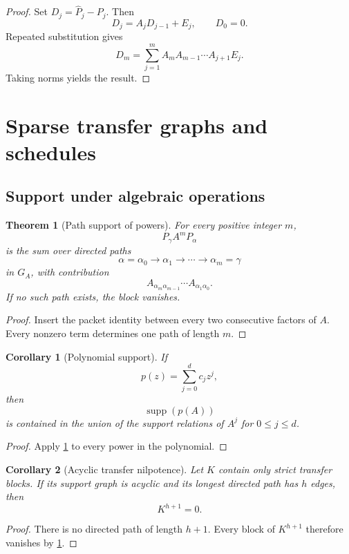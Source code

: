 \documentclass{aomart}
\newtheorem{theorem}{Theorem}[section]
\newtheorem{corollary}[corollary]{Corollary}
\theoremstyle{definition}
\theoremstyle{remark}
\newcommand{\supp}{\operatorname{supp}}
\begin{document}
\begin{proof}
Set \(D_j=\widehat P_j-P_j\). Then
\[
D_j=A_jD_{j-1}+E_j,
\qquad
D_0=0.
\]
Repeated substitution gives
\[
D_m
=
\sum_{j=1}^{m}
A_mA_{m-1}\cdots A_{j+1}E_j.
\]
Taking norms yields the result.
\end{proof}

\section{Sparse transfer graphs and schedules}\label{sec:graphs}

\subsection{Support under algebraic operations}

\begin{theorem}[Path support of powers]\label{thm:path_support}
For every positive integer \(m\),
\[
P_\gamma A^mP_\alpha
\]
is the sum over directed paths
\[
\alpha=\alpha_0
\longrightarrow
\alpha_1
\longrightarrow\cdots\longrightarrow
\alpha_m=\gamma
\]
in \(G_A\), with contribution
\[
A_{\alpha_m\alpha_{m-1}}
\cdots
A_{\alpha_1\alpha_0}.
\]
If no such path exists, the block vanishes.
\end{theorem}

\begin{proof}
Insert the packet identity between every two consecutive factors of \(A\). Every nonzero term determines one path of length \(m\).
\end{proof}

\begin{corollary}[Polynomial support]\label{cor:polynomial_support}
If
\[
p(z)=\sum_{j=0}^dc_jz^j,
\]
then
\[
\supp(p(A))
\]
is contained in the union of the support relations of \(A^j\) for \(0\leq j\leq d\).
\end{corollary}

\begin{proof}
Apply \cref{thm:path_support} to every power in the polynomial.
\end{proof}

\begin{corollary}[Acyclic transfer nilpotence]\label{cor:acyclic_nilpotence}
Let \(K\) contain only strict transfer blocks. If its support graph is acyclic and its longest directed path has \(h\) edges, then
\[
K^{h+1}=0.
\]
\end{corollary}

\begin{proof}
There is no directed path of length \(h+1\). Every block of \(K^{h+1}\) therefore vanishes by \cref{thm:path_support}.
\end{proof}
\end{document}
